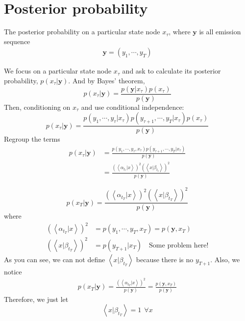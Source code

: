 \section{Posterior probability}
\begin{definition} 
The posterior probability on a particular state node $x_{\tau}$, where $\textbf{y}$ is all emission sequence
\begin{align*}
        \textbf{y} = (y_1,\cdots,y_T)
\end{align*} 
\end{definition}
\noindent We focus on a particular state node $x_{\tau}$ and ask to calculate its posterior probability, $p(x_{\tau}| \textbf{y})$. And by Bayes' theorem,
\begin{equation}
p(x_{\tau} | \textbf{y}) = \frac{p(\textbf{y}|x_{\tau}) p(x_{\tau})}{p(\textbf{y})}
\end{equation}
Then, conditioning on $x_{\tau}$ and use conditional independence:
\begin{equation}
p(x_{\tau} | \textbf{y}) = \frac{p(y_1,\cdots,y_{\tau}|x_{\tau}) p(y_{\tau+1},\cdots,y_T|x_{\tau}) p(x_{\tau})}{p(\textbf{y})}
\end{equation}
Regroup the terms
\begin{equation}
\begin{split}
p(x_{\tau} | \textbf{y}) &= \frac{p(y_1,\cdots,y_{\tau},x_{\tau}) p(y_{\tau+1},\cdots,y_T|x_{\tau})}{p(\textbf{y})}\\
&=\frac{(\left<\alpha_{t_{\tau}}|x \right>)^2 (\left<x|\beta_{t_{\tau}} \right>)^2 }{p(\textbf{y})}
\end{split}
\end{equation}

\begin{definition}
\label{specialposterior}
\begin{equation}
p(x_T | \textbf{y}) =\frac{(\left<\alpha_{t_T}|x \right>)^2 (\left<x|\beta_{t_T} \right>)^2 }{p(\textbf{y})}
\end{equation}
where
\begin{align}
        (\left<\alpha_{t_T}|x \right>)^2 &=  p(y_1,\cdots,y_T,x_T) = p(\textbf{y}, x_T) \\
        (\left<x|\beta_{t_T} \right>)^2 &= p(y_{T+1}|x_T)\text{~~~Some problem here!}
\end{align}
As you can see, we can not define $\left<x|\beta_{t_T} \right>$ because there is no $y_{T+1}$. Also, we notice
\begin{align*}
        p(x_T | \textbf{y}) = \frac{(\left<\alpha_{t_T}|x \right>)^2}{p(\textbf{y})} = \frac{p(\textbf{y}, x_T)}{p(\textbf{y})}
\end{align*}
Therefore, we just let
\begin{equation}
        \left<x|\beta_{t_T} \right>=1~~\forall x
\end{equation}
\end{definition}

